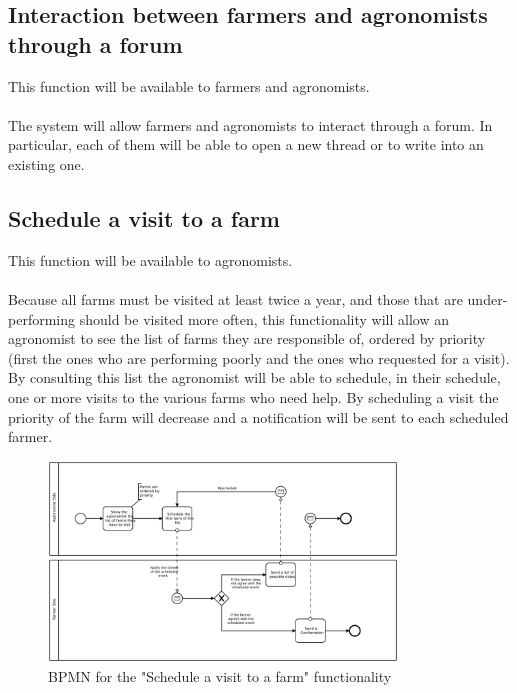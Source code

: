 \documentclass[10pt]{report}
\begin{document}
\subsection{Interaction between farmers and agronomists through a forum}
This function will be available to farmers and agronomists.\\ \\
The system will allow farmers and agronomists to interact through a forum. In particular, each of them will be able to open a new thread or to write into an existing one.
\subsection{Schedule a visit to a farm}
This function will be available to agronomists.\\ \\
Because all farms must be visited at least twice a year, and those that are under-performing should be visited more often, this functionality will allow an agronomist to see the list of farms they are responsible of, ordered by priority (first the ones who are performing poorly and the ones who requested for a visit). By consulting this list the agronomist will be able to schedule, in their schedule, one or more visits to the various farms who need help. By scheduling a visit the priority of the farm will decrease and a notification will be sent to each scheduled farmer.
\begin{figure}[H]
    \centering
    \includegraphics[width=350px]{BPMN/BPMN 227.jpg}
    \caption{BPMN for the "Schedule a visit to a farm" functionality}
\end{figure}
\end{document}
